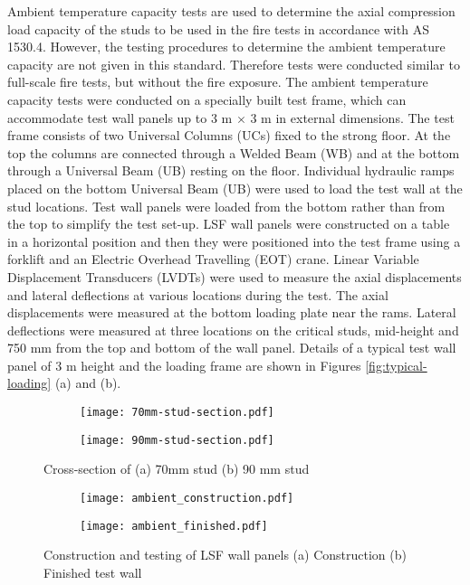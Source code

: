Ambient temperature capacity tests are used to determine the axial compression load capacity of the studs to be used in the fire tests in accordance with AS 1530.4. However, the testing procedures to determine the ambient temperature capacity are not given in this standard. Therefore tests were conducted similar to full-scale fire tests, but without the fire exposure. The ambient temperature capacity tests were conducted on a specially built test frame, which can accommodate test wall panels up to 3 m $\times$ 3 m in external dimensions. The test frame consists of two Universal Columns (UCs) fixed to the strong floor. At the top the columns are connected through a Welded Beam (WB) and at the bottom through a Universal Beam (UB) resting on the floor. Individual hydraulic ramps placed on the bottom Universal Beam (UB) were used to load the test wall at the stud locations. Test wall panels were loaded from the bottom rather than from the top to simplify the test set-up. LSF wall panels were constructed on a table in a horizontal position and then they were positioned into the test frame using a forklift and an Electric Overhead Travelling (EOT) crane. Linear Variable Displacement Transducers (LVDTs) were used to measure the axial displacements and lateral deflections at various locations during the test. The axial displacements were measured at the bottom loading plate near the rams. Lateral deflections were measured at three locations on the critical studs, mid-height and 750 mm from the top and bottom of the wall panel. Details of a typical test wall panel of 3 m height and the loading frame are shown in Figures \ref{fig:typical-loading} (a) and (b).
\begin{figure}
	\centering
	\begin{subfigure}[b]{0.3\textwidth}
		\centering
		\texttt{[image: 70mm-stud-section.pdf]}
		\caption{}
		\label{subfig:70mm-section}
	\end{subfigure}
	\begin{subfigure}[b]{0.3\textwidth}
		\centering
		\texttt{[image: 90mm-stud-section.pdf]}
		\caption{}
		\label{subfig:90mm-section}
	\end{subfigure}
	   \caption{Cross-section of (a) 70mm stud (b) 90 mm stud}
	   \label{fig:stud-cross-section}
\end{figure}
\begin{figure}
	\centering
	\begin{subfigure}[b]{0.75\textwidth}
		\centering
		\texttt{[image: ambient\_construction.pdf]}
		\caption{}
		\label{subfig:ambient_construction}
	\end{subfigure}
	\begin{subfigure}[b]{0.75\textwidth}
		\centering
		\texttt{[image: ambient\_finished.pdf]}
		\caption{}
		\label{subfig:ambient_finished}
	\end{subfigure}
	   \caption{Construction and testing of LSF wall panels (a) Construction (b) Finished test wall}
	   \label{fig:typical-ambient}
\end{figure}
